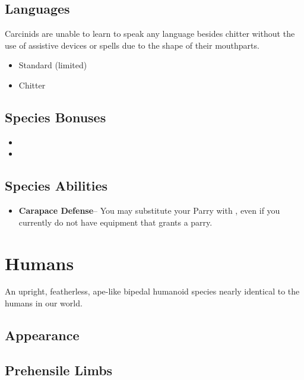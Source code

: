 {\subsection*{Languages}
Carcinids are unable to learn to speak any language besides chitter without the use of assistive devices or spells due to the shape of their mouthparts.

\begin{itemize}
	\item Standard (limited)
	\item Chitter
\end{itemize}

\subsection*{Species Bonuses}

\begin{itemize}
	\item {}
	\item {}
\end{itemize}

\subsection*{Species Abilities}

\begin{itemize}
	\item \textbf{Carapace Defense}-- You may substitute your Parry with , even if you currently do not have equipment that grants a parry.
\end{itemize}

\GRPpagebreak
\section{Humans}

An upright, featherless, ape-like bipedal humanoid species nearly identical to the humans in our world.

\subsection*{Appearance}

\subsection*{Prehensile Limbs}

}
